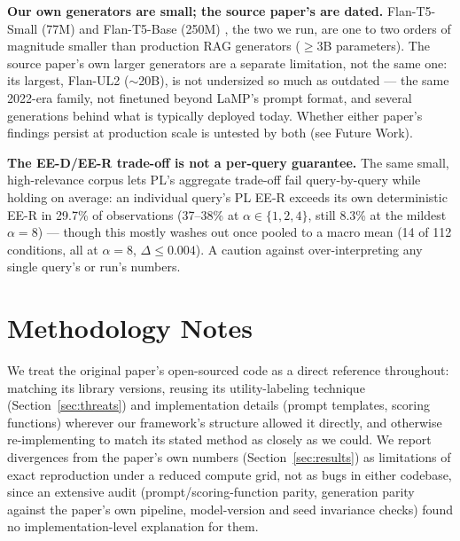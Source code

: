 \documentclass[10pt,twocolumn]{article}
\begin{document}
\textbf{Our own generators are small; the source paper's are dated.} Flan-T5-Small
(77M) and Flan-T5-Base (250M) \cite{chung2024scaling}, the two we run, are one to two
orders of magnitude smaller than production RAG generators ($\geq$3B parameters).
The source paper's own larger generators are a separate limitation, not the same
one: its largest, Flan-UL2 ($\sim$20B), is not undersized so much as outdated ---
the same 2022-era family, not finetuned beyond LaMP's prompt format, and several
generations behind what is typically deployed today. Whether either paper's findings
persist at production scale is untested by both (see Future Work).

\textbf{The EE-D/EE-R trade-off is not a per-query guarantee.} The same small,
high-relevance corpus lets PL's aggregate trade-off fail query-by-query while holding
on average: an individual query's PL EE-R exceeds its own deterministic EE-R in
29.7\% of observations (37--38\% at $\alpha\in\{1,2,4\}$, still 8.3\% at the mildest
$\alpha{=}8$) --- though this mostly washes out once pooled to a macro mean (14 of
112 conditions, all at $\alpha{=}8$, $\Delta \leq 0.004$). A caution against
over-interpreting any single query's or run's numbers.

\section{Methodology Notes}
\label{sec:method}

We treat the original paper's open-sourced code as a direct reference throughout:
matching its library versions, reusing its utility-labeling technique
(Section~\ref{sec:threats}) and implementation details (prompt templates, scoring
functions) wherever our framework's structure allowed it directly, and otherwise
re-implementing to match its stated method as closely as we could. We report
divergences from the paper's own numbers (Section~\ref{sec:results}) as limitations
of exact reproduction under a reduced compute grid, not as bugs in either codebase,
since an extensive audit (prompt/scoring-function parity, generation parity against
the paper's own pipeline, model-version and seed invariance checks) found no
implementation-level explanation for them.
\end{document}
